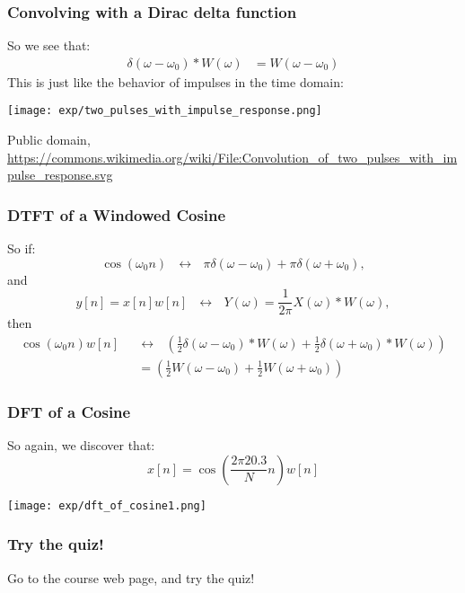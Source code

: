 \documentclass{beamer}
\begin{document}
\begin{frame}
  \frametitle{Convolving with a Dirac delta function}

  So we see that:
  \begin{align*}
    \delta(\omega-\omega_0)\ast W(\omega)
    &= W(\omega-\omega_0)
  \end{align*}
  This is just like the behavior of impulses in the time domain:
  \begin{center}
    \texttt{[image: exp/two\_pulses\_with\_impulse\_response.png]}

    {\tiny Public domain, \url{https://commons.wikimedia.org/wiki/File:Convolution_of_two_pulses_with_impulse_response.svg}}
  \end{center}
\end{frame}

\begin{frame}
  \frametitle{DTFT of a Windowed Cosine}

  So if:
  \begin{displaymath}
    \cos(\omega_0 n)~~~\leftrightarrow~~~\pi\delta(\omega-\omega_0) + \pi\delta(\omega+\omega_0),
  \end{displaymath}
  and
  \begin{displaymath}
    y[n]=x[n]w[n] ~~~\leftrightarrow~~~Y(\omega) = \frac{1}{2\pi} X(\omega)\ast W(\omega),
  \end{displaymath}
  then
  \begin{align*}
    \cos(\omega_0 n)w[n] ~~~
    &\leftrightarrow~~~
    \left(\frac{1}{2}\delta(\omega-\omega_0)\ast W(\omega)+
    \frac{1}{2}\delta(\omega+\omega_0)\ast W(\omega)\right)\\
    &= \left(\frac{1}{2}W(\omega-\omega_0)+
    \frac{1}{2}W(\omega+\omega_0)\right)
  \end{align*}
\end{frame}  
  
\begin{frame}
  \frametitle{DFT of a Cosine}

  So again, we discover that:
  \[
  x[n] = \cos\left(\frac{2\pi 20.3}{N}n\right) w[n]
  \]
  
  \centerline{\texttt{[image: exp/dft\_of\_cosine1.png]}}
\end{frame}

\begin{frame}
  \frametitle{Try the quiz!}

  Go to the course web page, and try the quiz!
\end{frame}
\end{document}
